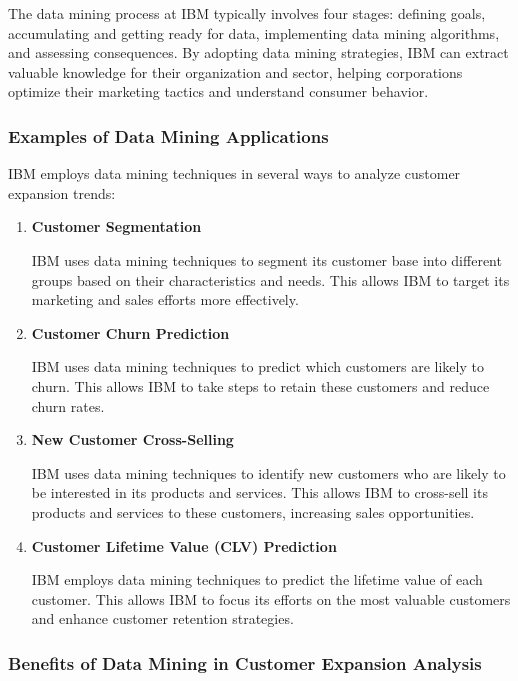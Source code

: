 The data mining process at IBM typically involves four stages: defining goals, accumulating and getting ready for data, implementing data mining algorithms, and assessing consequences. By adopting data mining strategies, IBM can extract valuable knowledge for their organization and sector, helping corporations optimize their marketing tactics and understand consumer behavior.

\subsubsection{Examples of Data Mining Applications}

IBM employs data mining techniques in several ways to analyze customer expansion trends:
\begin{enumerate}

\item \textbf{Customer Segmentation}

IBM uses data mining techniques to segment its customer base into different groups based on their characteristics and needs. This allows IBM to target its marketing and sales efforts more effectively.

\item \textbf{Customer Churn Prediction}

IBM uses data mining techniques to predict which customers are likely to churn. This allows IBM to take steps to retain these customers and reduce churn rates.

\item \textbf{New Customer Cross-Selling}

IBM uses data mining techniques to identify new customers who are likely to be interested in its products and services. This allows IBM to cross-sell its products and services to these customers, increasing sales opportunities.

\item \textbf{Customer Lifetime Value (CLV) Prediction}

IBM employs data mining techniques to predict the lifetime value of each customer. This allows IBM to focus its efforts on the most valuable customers and enhance customer retention strategies.
\end{enumerate}
\subsubsection{Benefits of Data Mining in Customer Expansion Analysis}

